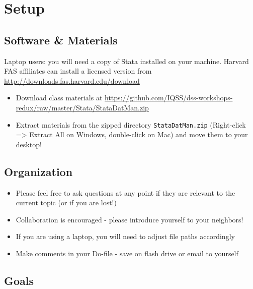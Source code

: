 \documentclass[]{book}
\providecommand{\tightlist}{%
  \setlength{\itemsep}{0pt}\setlength{\parskip}{0pt}}
\begin{document}
\section{Setup}\label{setup-7}

\subsection{Software \& Materials}\label{software-materials-7}

Laptop users: you will need a copy of Stata installed on your machine.
Harvard FAS affiliates can install a licensed version from
\url{http://downloads.fas.harvard.edu/download}

\begin{itemize}
\tightlist
\item
  Download class materials at
  \url{https://github.com/IQSS/dss-workshops-redux/raw/master/Stata/StataDatMan.zip}
\item
  Extract materials from the zipped directory \texttt{StataDatMan.zip}
  (Right-click =\textgreater{} Extract All on Windows, double-click on
  Mac) and move them to your desktop!
\end{itemize}

\subsection{Organization}\label{organization-1}

\begin{itemize}
\tightlist
\item
  Please feel free to ask questions at any point if they are relevant to
  the current topic (or if you are lost!)
\item
  Collaboration is encouraged - please introduce yourself to your
  neighbors!
\item
  If you are using a laptop, you will need to adjust file paths
  accordingly
\item
  Make comments in your Do-file - save on flash drive or email to
  yourself
\end{itemize}

\subsection{Goals}\label{goals-7}
\end{document}
